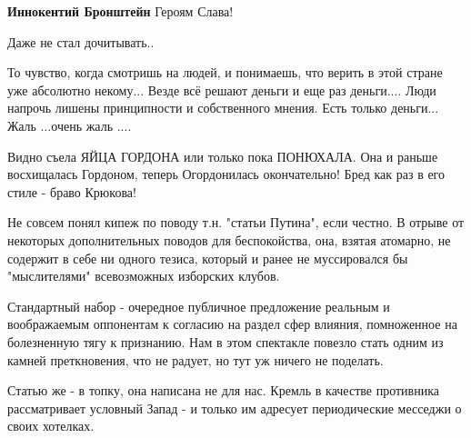 \begin{itemize}
\begin{itemize}
\textbf{Иннокентий Бронштейн} Героям Слава!
\end{itemize}

 
Даже не стал дочитывать..

 

То чувство, когда смотришь на людей, и понимаешь, что верить в этой стране уже
абсолютно некому... Везде всё решают деньги и еще раз деньги.... Люди напрочь
лишены принципности и собственного мнения. Есть только деньги... Жаль ...очень
жаль ....


 
Видно съела ЯЙЦА ГОРДОНА или только пока ПОНЮХАЛА. Она и раньше восхищалась Гордоном, теперь Огордонилась окончательно! Бред как раз в его стиле - браво Крюкова!

 

Не совсем понял кипеж по поводу т.н. "статьи Путина", если честно. В отрыве от
некоторых дополнительных поводов для беспокойства, она, взятая атомарно, не
содержит в себе ни одного тезиса, который и ранее не муссировался бы
"мыслителями" всевозможных изборских клубов. 

Стандартный набор - очередное публичное предложение реальным и воображаемым
оппонентам к согласию на раздел сфер влияния, помноженное на болезненную тягу к
признанию. Нам в этом спектакле повезло стать одним из камней преткновения, что
не радует, но тут уж ничего не поделать. 

Статью же - в топку, она написана не для нас. Кремль в качестве противника
рассматривает условный Запад - и только им адресует периодические месседжи о
своих хотелках.


\end{itemize}
